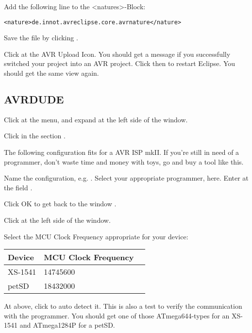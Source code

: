 Add the following line to the <natures>-Block:

\texttt{<nature>de.innot.avreclipse.core.avrnature</nature>}

Save the file by clicking .


Click at the AVR Upload Icon. You should get a message  if you successfully switched your project into an AVR project.
Click  then to restart Eclipse. You should get the same view again.

\subsection{AVRDUDE}

Click  at the menu, and expand  at the left
side of the  window.

Click  in the section .

The following configuration fits for a AVR ISP mkII. If you're still in need of a programmer,
don't waste time and money with toys, go and buy a tool like this. 

Name the configuration, e.g. . Select your appropriate programmer, 
 here. Enter  at the field .


Click OK to get back to the window . 

Click  at the left side of the  window.

Select the MCU Clock Frequency appropriate for your device:

\begin{tabular}[c]{l l l}
\toprule
Device		& MCU Clock Frequency \\
\midrule
XS-1541 & 14745600 \\
petSD	& 18432000 \\
\bottomrule
\end{tabular}

At  above, click  to auto detect it. This is also a test
to verify the communication with the programmer. You should get one of those ATmega644-types for 
an XS-1541 and ATmega1284P for a petSD.

